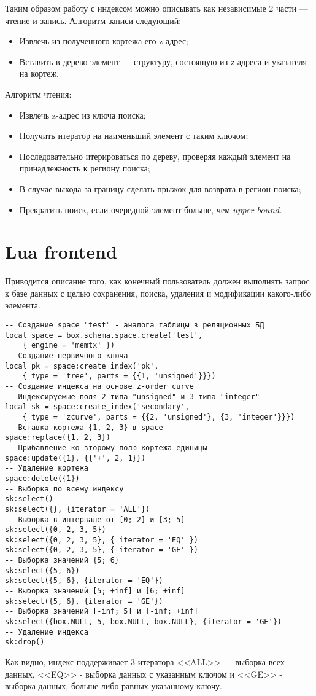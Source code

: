 Таким образом работу с индексом можно описывать как независимые 2 части ---
чтение и запись.
Алгоритм записи следующий:
\begin{itemize}
	\item Извлечь из полученного кортежа его z-адрес;
	\item Вставить в дерево элемент --- структуру, состоящую из z-адреса и указателя на кортеж.
\end{itemize}

Алгоритм чтения:
\begin{itemize}
	\item Извлечь z-адрес из ключа поиска;
	\item Получить итератор на наименьший элемент с таким ключом;
	\item Последовательно итерироваться по дереву, проверяя каждый элемент на принадлежность к региону поиска;
	\item В случае выхода за границу сделать прыжок для возврата в регион поиска;
	\item Прекратить поиск, если очередной элемент больше, чем $upper\_bound$.
\end{itemize}

\section{Lua frontend}
Приводится описание того, как конечный пользователь должен выполнять
запрос к базе данных с целью сохранения, поиска, удаления и модификации
какого-либо элемента.

\begin{lstlisting}
-- Создание space "test" - аналога таблицы в реляционных БД
local space = box.schema.space.create('test',
	{ engine = 'memtx' })
-- Создание первичного ключа
local pk = space:create_index('pk', 
	{ type = 'tree', parts = {{1, 'unsigned'}}})
-- Создание индекса на основе z-order curve
-- Индексируемые поля 2 типа "unsigned" и 3 типа "integer"
local sk = space:create_index('secondary',
	{ type = 'zcurve', parts = {{2, 'unsigned'}, {3, 'integer'}}})
-- Вставка кортежа {1, 2, 3} в space
space:replace({1, 2, 3})
-- Прибавление ко второму полю кортежа единицы
space:update({1}, {{'+', 2, 1}})
-- Удаление кортежа
space:delete({1})
-- Выборка по всему индексу
sk:select()
sk:select({}, {iterator = 'ALL'})
-- Выборка в интервале от [0; 2] и [3; 5]
sk:select({0, 2, 3, 5})
sk:select({0, 2, 3, 5}, { iterator = 'EQ' })
sk:select({0, 2, 3, 5}, { iterator = 'GE' })
-- Выборка значений {5; 6}
sk:select({5, 6})
sk:select({5, 6}, {iterator = 'EQ'})
-- Выборка значений [5; +inf] и [6; +inf]
sk:select({5, 6}, {iterator = 'GE'})
-- Выборка значений [-inf; 5] и [-inf; +inf]
sk:select({box.NULL, 5, box.NULL, box.NULL}, {iterator = 'GE'})
-- Удаление индекса
sk:drop()
\end{lstlisting}
Как видно, индекс поддерживает 3 итератора <<ALL>> --- выборка всех данных,
<<EQ>> - выборка данных с указанным ключом и <<GE>> - выборка данных, больше либо равных указанному ключу.

